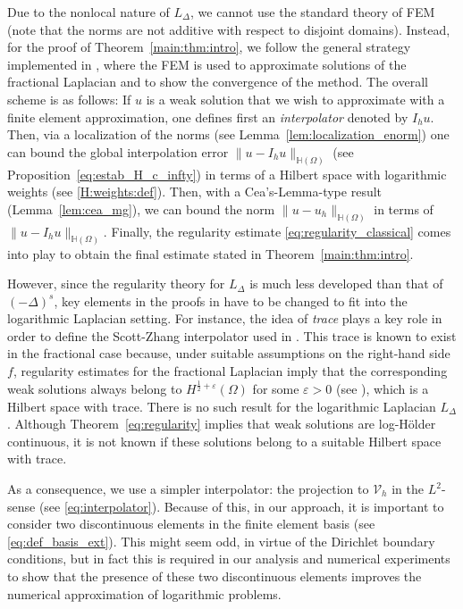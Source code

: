 \documentclass[10 pt]{article}
\numberwithin{equation}{section}
\def\eps{\varepsilon}
\begin{document}
 Due to the nonlocal nature of $L_\Delta$, we cannot use the standard theory of FEM (note that the norms are not additive with respect to disjoint domains). Instead, for the proof of Theorem~\ref{main:thm:intro}, we follow the general strategy implemented in \cite{Bor17}, where the FEM is used to approximate solutions of the fractional Laplacian and to show the convergence of the method.  The overall scheme is as follows: If $u$ is a weak solution that we wish to approximate with a finite element approximation, one defines first an \emph{interpolator} denoted by $I_h u$.  Then, via a localization of the norms (see Lemma~\ref{lem:localization_enorm}) one can bound the global interpolation error $\|u-I_h u\|_{\mathbb H(\Omega)}$ (see Proposition~\ref{eq:estab_H_c_infty}) in terms of a Hilbert space with logarithmic weights (see \eqref{H:weights:def}).  Then, with a Cea's-Lemma-type result (Lemma~\ref{lem:cea_mg}), we can bound the norm $\|u-u_h\|_{\mathbb H(\Omega)}$ in terms of $\|u-I_h u\|_{\mathbb H(\Omega)}$.  Finally, the regularity estimate \eqref{eq:regularity_classical} comes into play to obtain the final estimate stated in Theorem~\ref{main:thm:intro}.

 However, since the regularity theory for $L_\Delta$ is much less developed than that of $(-\Delta)^s$, key elements in the proofs in \cite{Bor17} have to be changed to fit into the logarithmic Laplacian setting.  For instance, the idea of \emph{trace} plays a key role in order to define the Scott-Zhang interpolator used in \cite{Bor17}. This trace is known to exist in the fractional case because, under suitable assumptions on the right-hand side $f$, regularity estimates for the fractional Laplacian imply that the corresponding weak solutions always belong to $H^{\frac{1}{2}+\eps}(\Omega)$ for some $\eps>0$ (see \cite[Theorem 2.3.6]{Bor17}), which is a Hilbert space with trace.  There is no such result for the logarithmic Laplacian $L_\Delta$.  Although Theorem~\ref{eq:regularity} implies that weak solutions are log-Hölder continuous, it is not known if these solutions belong to a suitable Hilbert space with trace.

 As a consequence, we use a simpler interpolator: the projection to $\mathcal V_h$ in the $L^2$-sense (see \eqref{eq:interpolator}). Because of this, in our approach, it is important to consider two discontinuous elements in the finite element basis (see \eqref{eq:def_basis_ext}).  This might seem odd, in virtue of the Dirichlet boundary conditions, but in fact this is required in our analysis and numerical experiments to show that the presence of these two discontinuous elements improves the numerical approximation of logarithmic problems.
\end{document}
